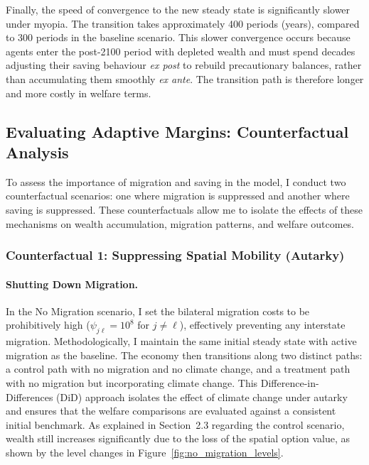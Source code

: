 \documentclass[12pt, a4paper]{article}
\begin{document}
Finally, the speed of convergence to the new steady state is significantly slower under myopia. The transition takes approximately 400 periods (years), compared to 300 periods in the baseline scenario. This slower convergence occurs because agents enter the post-2100 period with depleted wealth and must spend decades adjusting their saving behaviour \textit{ex post} to rebuild precautionary balances, rather than accumulating them smoothly \textit{ex ante}. The transition path is therefore longer and more costly in welfare terms.

\subsection{Evaluating Adaptive Margins: Counterfactual Analysis}
To assess the importance of migration and saving in the model, I conduct two counterfactual scenarios: one where migration is suppressed and another where saving is suppressed. These counterfactuals allow me to isolate the effects of these mechanisms on wealth accumulation, migration patterns, and welfare outcomes.

\subsubsection*{\large Counterfactual 1: Suppressing Spatial Mobility (Autarky)}


\paragraph{Shutting Down Migration.} In the No Migration scenario, I set the bilateral migration costs to be prohibitively high ($\psi_{j\ell} = 10^8$ for $j \neq \ell$), effectively preventing any interstate migration. Methodologically, I maintain the same initial steady state with active migration as the baseline. The economy then transitions along two distinct paths: a control path with no migration and no climate change, and a treatment path with no migration but incorporating climate change. This Difference-in-Differences (DiD) approach isolates the effect of climate change under autarky and ensures that the welfare comparisons are evaluated against a consistent initial benchmark. As explained in Section~2.3 regarding the control scenario, wealth still increases significantly due to the loss of the spatial option value, as shown by the level changes in Figure~\ref{fig:no_migration_levels}.


\end{document}
